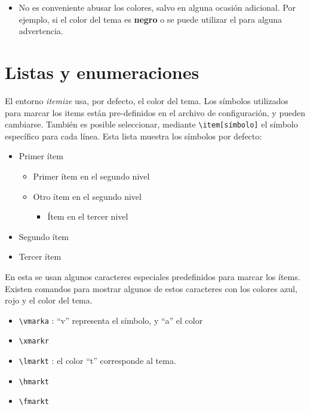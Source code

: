 \begin{itemize}
\item [\hmarkr] No es conveniente abusar los colores, salvo en alguna ocasión adicional. Por ejemplo, si el color del tema es {\bf negro} o  se puede utilizar el  para alguna advertencia.
\end{itemize}

\section{Listas y enumeraciones}

El entorno \textit{itemize} usa, por defecto, el color del tema. Los símbolos utilizados para marcar los items están pre-definidos en el archivo de configuración, y pueden cambiarse. También es posible seleccionar, mediante \verb+\item[símbolo]+ el símbolo específico para cada línea. Esta lista muestra los símbolos por defecto:

\begin{itemize}
\item Primer ítem
\begin{itemize}
\item Primer ítem en el segundo nivel
\item Otro ítem en el segundo nivel
\begin{itemize}
\item Ítem en el tercer nivel
\end{itemize}
\end{itemize}
\item Segundo ítem
\item Tercer ítem \\
\end{itemize}

En esta se usan algunos caracteres especiales predefinidos para marcar los ítems. Existen comandos para mostrar algunos de estos caracteres con los colores azul, rojo y el color del tema.

\begin{itemize}
\item[\vmarka] \verb+\vmarka+ : ``v'' representa el símbolo, y ``a'' el color
\item[\xmarkr] \verb+\xmarkr+
\item[\lmarkt] \verb+\lmarkt+ : el color ``t'' corresponde al tema.
\item[\hmarkt] \verb+\hmarkt+ 
\item[\fmarkt] \verb+\fmarkt+ \\
\end{itemize}

